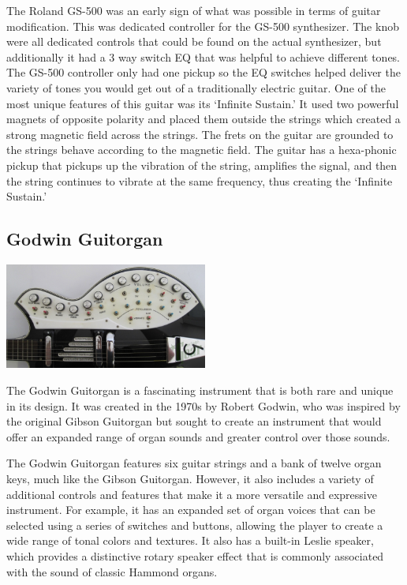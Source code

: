 \documentclass[]{MSword}
\begin{document}
\par{The Roland GS-500\cite{rolandgs500} was an early sign of what was possible in terms of guitar modification. This was  dedicated controller for the GS-500 synthesizer. The knob were all dedicated controls that could be found on the actual synthesizer, but additionally it had a 3 way switch EQ that was helpful to achieve different tones. The GS-500 controller only had one pickup so the EQ switches helped deliver the variety of tones you would get out of a traditionally electric guitar. One of the most unique features of this guitar was its ‘Infinite Sustain.’ It used two powerful magnets of opposite polarity and placed them outside the strings which created a strong magnetic field across the strings. The frets on the guitar are grounded to the strings behave according to the magnetic field. The guitar has a hexa-phonic pickup that pickups up the vibration of the string, amplifies the signal, and then the string continues to vibrate at the same frequency, thus creating the ‘Infinite Sustain.’}

\subsection*{Godwin Guitorgan}

\begin{center}
  \includegraphics[width=0.5\textwidth]{img/guitorgan.png}
\end{center}

\par{The Godwin Guitorgan\cite{godwinguitorgan} is a fascinating instrument that is both rare and unique in its design. It was created in the 1970s by Robert Godwin, who was inspired by the original Gibson Guitorgan\cite{gibsonguitorgan} but sought to create an instrument that would offer an expanded range of organ sounds and greater control over those sounds.}

\par{The Godwin Guitorgan features six guitar strings and a bank of twelve organ keys, much like the Gibson Guitorgan. However, it also includes a variety of additional controls and features that make it a more versatile and expressive instrument. For example, it has an expanded set of organ voices that can be selected using a series of switches and buttons, allowing the player to create a wide range of tonal colors and textures. It also has a built-in Leslie speaker, which provides a distinctive rotary speaker effect that is commonly associated with the sound of classic Hammond organs.}
\end{document}

